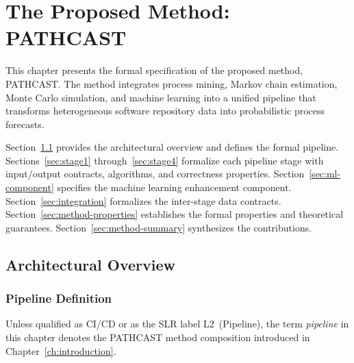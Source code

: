 
\chapter{The Proposed Method: PATHCAST}
\label{ch:method}

This chapter presents the formal specification of the proposed method,
PATHCAST. The method integrates process mining, Markov chain estimation,
Monte Carlo simulation, and machine learning into a unified pipeline that
transforms heterogeneous software repository data into probabilistic
process forecasts.

Section~\ref{sec:method-overview} provides the architectural overview and
defines the formal pipeline. Sections~\ref{sec:stage1}
through~\ref{sec:stage4} formalize each pipeline stage with input/output
contracts, algorithms, and correctness properties.
Section~\ref{sec:ml-component} specifies the machine learning enhancement
component. Section~\ref{sec:integration} formalizes the inter-stage data
contracts. Section~\ref{sec:method-properties} establishes the formal
properties and theoretical guarantees.
Section~\ref{sec:method-summary} synthesizes the contributions.


\section{Architectural Overview}
\label{sec:method-overview}

\subsection{Pipeline Definition}
\label{sec:pipeline-def}

Unless qualified as CI/CD or as the SLR label L2~(Pipeline), the term
\emph{pipeline} in this chapter denotes the PATHCAST method composition
introduced in Chapter~\ref{ch:introduction}.

